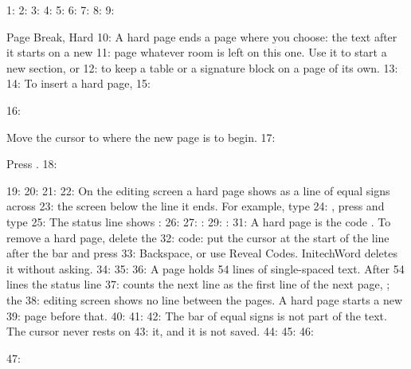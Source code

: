 1: %
2: %
3: %
4: %
5: %
6: %
7: %
8: 
9: \begin{Feature}{Page Break, Hard}
10: A hard page ends a page where you choose: the text after it starts on a new
11: page whatever room is left on this one.  Use it to start a new section, or
12: to keep a table or a signature block on a page of its own.
13: 
14: To insert a hard page,
15: \begin{WPSteps}
16: \item Move the cursor to where the new page is to begin.
17: \item Press .
18: \end{WPSteps}
19: 
20: 
21: 
22: On the editing screen a hard page shows as a line of equal signs across
23: the screen below the line it ends.  For example, type
24: , press  and type
25:   The status line shows :
26: 
27: : 
29: : 
31: A hard page is the code \Code{[HPg]}.  To remove a hard page, delete the
32: code: put the cursor at the start of the line after the bar and press
33: Backspace, or use Reveal Codes.  InitechWord deletes it without asking.
34: 
35: 
36: A page holds 54 lines of single-spaced text.  After 54 lines the status line
37: counts the next line as the first line of the next page, ; the
38: editing screen shows no line between the pages.  A hard page starts a new
39: page before that.
40: 
41: 
42: The bar of equal signs is not part of the text.  The cursor never rests on
43: it, and it is not saved.
44: 
45: 
46: \end{Feature}
47: 
